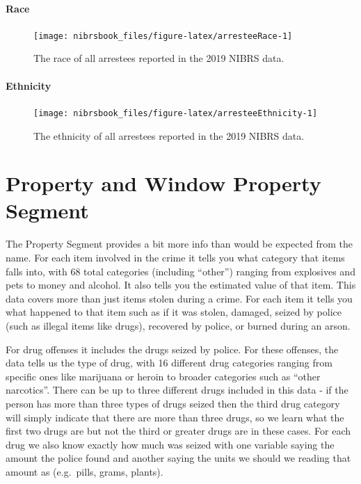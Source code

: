 \documentclass[
  12pt,
  openany]{book}
\begin{document}
\hypertarget{race-2}{%
\subsubsection{Race}\label{race-2}}

\begin{figure}

{\centering \texttt{[image: nibrsbook\_files/figure-latex/arresteeRace-1]} 

}

\caption{The race of all arrestees reported in the 2019 NIBRS data.}\label{fig:arresteeRace}
\end{figure}

\hypertarget{ethnicity-1}{%
\subsubsection{Ethnicity}\label{ethnicity-1}}

\begin{figure}

{\centering \texttt{[image: nibrsbook\_files/figure-latex/arresteeEthnicity-1]} 

}

\caption{The ethnicity of all arrestees reported in the 2019 NIBRS data.}\label{fig:arresteeEthnicity}
\end{figure}

\hypertarget{property-and-window-property-segment}{%
\chapter{Property and Window Property Segment}\label{property-and-window-property-segment}}

The Property Segment provides a bit more info than would be expected from the name. For each item involved in the crime it tells you what category that items falls into, with 68 total categories (including ``other'') ranging from explosives and pets to money and alcohol. It also tells you the estimated value of that item. This data covers more than just items stolen during a crime. For each item it tells you what happened to that item such as if it was stolen, damaged, seized by police (such as illegal items like drugs), recovered by police, or burned during an arson.

For drug offenses it includes the drugs seized by police. For these offenses, the data tells us the type of drug, with 16 different drug categories ranging from specific ones like marijuana or heroin to broader categories such as ``other narcotics''. There can be up to three different drugs included in this data - if the person has more than three types of drugs seized then the third drug category will simply indicate that there are more than three drugs, so we learn what the first two drugs are but not the third or greater drugs are in these cases. For each drug we also know exactly how much was seized with one variable saying the amount the police found and another saying the units we should we reading that amount as (e.g.~pills, grams, plants).
\end{document}
